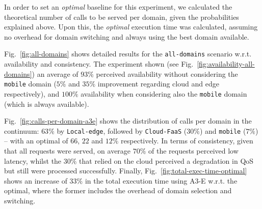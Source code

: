 


In order to set an \emph{optimal} baseline for this experiment, we calculated the theoretical number of calls to be served per domain, given the probabilities explained above. Upon this, the \emph{optimal} execution time was calculated, assuming no overhead for domain switching and always using the best domain available.

Fig.~\ref{fig:all-domains} shows detailed results for the \texttt{all-domains} scenario w.r.t. availability and consistency. The experiment shown (see Fig.~\ref{fig:availability-all-domains}) an average of $93\%$ perceived availability without considering the \texttt{mobile} domain ($5\%$ and $35\%$ improvement regarding cloud and edge respectively), and $100\%$ availability when considering also the \texttt{mobile} domain (which is always available). 

Fig.~\ref{fig:calls-per-domain-a3e} shows the distribution of calls per domain in the continuum: $63\%$ by \texttt{Local-edge}, followed by \texttt{Cloud-FaaS} ($30\%$) and \texttt{mobile} ($7\%$) -- with an optimal of $66$, $22$ and $12\%$ respectively. In terms of consistency, given that all requests were served, on average $70\%$ of the requests perceived low latency, whilst the $30\%$ that relied on the cloud perceived a degradation in QoS but still were processed successfully. Finally, Fig.~\ref{fig:total-exec-time-optimal} shows an increase of $33\%$ in the total execution time using A3-E w.r.t. the optimal, where the former includes the overhead of domain selection and switching.
 
